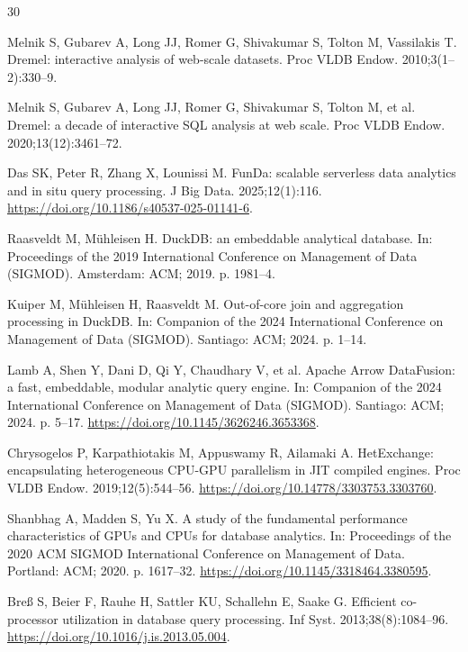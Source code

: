 \documentclass[10pt,a4paper]{article}
\begin{document}
\clearpage
{\sloppy
\begin{thebibliography}{30}
\small

Melnik S, Gubarev A, Long JJ, Romer G, Shivakumar S, Tolton M, Vassilakis T. Dremel: interactive analysis of web-scale datasets. Proc VLDB Endow. 2010;3(1--2):330--9.

Melnik S, Gubarev A, Long JJ, Romer G, Shivakumar S, Tolton M, et al. Dremel: a decade of interactive SQL analysis at web scale. Proc VLDB Endow. 2020;13(12):3461--72.

Das SK, Peter R, Zhang X, Lounissi M. FunDa: scalable serverless data analytics and in situ query processing. J Big Data. 2025;12(1):116. \url{https://doi.org/10.1186/s40537-025-01141-6}.

Raasveldt M, M{\"u}hleisen H. DuckDB: an embeddable analytical database. In: Proceedings of the 2019 International Conference on Management of Data (SIGMOD). Amsterdam: ACM; 2019. p. 1981--4.

Kuiper M, M{\"u}hleisen H, Raasveldt M. Out-of-core join and aggregation processing in DuckDB. In: Companion of the 2024 International Conference on Management of Data (SIGMOD). Santiago: ACM; 2024. p. 1--14.

Lamb A, Shen Y, Dani D, Qi Y, Chaudhary V, et al. Apache Arrow DataFusion: a fast, embeddable, modular analytic query engine. In: Companion of the 2024 International Conference on Management of Data (SIGMOD). Santiago: ACM; 2024. p. 5--17. \url{https://doi.org/10.1145/3626246.3653368}.

Chrysogelos P, Karpathiotakis M, Appuswamy R, Ailamaki A. HetExchange: encapsulating heterogeneous CPU-GPU parallelism in JIT compiled engines. Proc VLDB Endow. 2019;12(5):544--56. \url{https://doi.org/10.14778/3303753.3303760}.

Shanbhag A, Madden S, Yu X. A study of the fundamental performance characteristics of GPUs and CPUs for database analytics. In: Proceedings of the 2020 ACM SIGMOD International Conference on Management of Data. Portland: ACM; 2020. p. 1617--32. \url{https://doi.org/10.1145/3318464.3380595}.

Bre{\ss} S, Beier F, Rauhe H, Sattler KU, Schallehn E, Saake G. Efficient co-processor utilization in database query processing. Inf Syst. 2013;38(8):1084--96. \url{https://doi.org/10.1016/j.is.2013.05.004}.


\end{thebibliography}}
\end{document}
